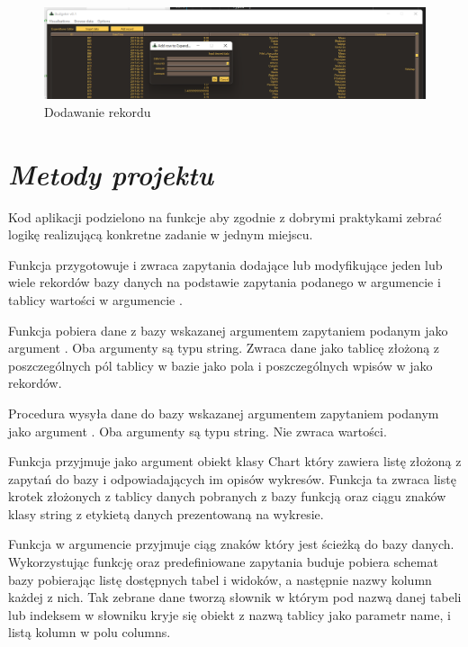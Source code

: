 \documentclass[a4paper,10pt, twoside]{report}
\newcommand{\customstylesection}[1]{\textbf{\textit{#1}}}
\begin{document}
\begin{figure}[H]           %
    \caption{Dodawanie rekordu}
    \label{fig:Dodawanie_rekordu}   %
    \centering  
    \includegraphics[width=12cm]{figures/Interface_Browse_AddRecord_v0.3.png}
\end{figure}

\section{\customstylesection{Metody projektu}} 
\label{Metody projektu}
{Kod aplikacji podzielono na funkcje aby zgodnie z dobrymi praktykami zebrać 
logikę realizującą konkretne zadanie w jednym miejscu.}

\medskip
{Funkcja  przygotowuje i zwraca 
zapytania dodające lub modyfikujące jeden lub wiele rekordów bazy danych na 
podstawie zapytania podanego w argumencie  i tablicy wartości 
w argumencie .}

\medskip
{Funkcja  pobiera dane z bazy wskazanej 
argumentem  zapytaniem podanym jako argument 
. Oba argumenty są typu string. Zwraca dane jako tablicę 
złożoną z poszczególnych pól tablicy w bazie jako pola i poszczególnych 
wpisów w jako rekordów.}

\medskip
{Procedura  wysyła dane do bazy wskazanej
argumentem  zapytaniem podanym jako argument 
. Oba argumenty są typu string. Nie zwraca wartości.}

\medskip
{Funkcja  przyjmuje jako argument 
 obiekt klasy Chart który zawiera listę złożoną z zapytań
 do bazy i odpowiadających im opisów wykresów. Funkcja ta zwraca listę krotek 
złożonych z tablicy danych pobranych z bazy funkcją  oraz 
ciągu znaków klasy string z etykietą danych prezentowaną na wykresie.}

\medskip
{Funkcja  w argumencie  
przyjmuje ciąg znaków który jest ścieżką do bazy danych. Wykorzystując funkcję 
 oraz predefiniowane zapytania buduje pobiera schemat bazy
 pobierając listę dostępnych tabel i widoków, a następnie nazwy kolumn każdej z 
nich. Tak zebrane dane tworzą słownik w którym pod nazwą danej tabeli lub 
indeksem w słowniku kryje się obiekt z nazwą tablicy jako parametr name, i listą
 kolumn w polu columns.}
\end{document}
